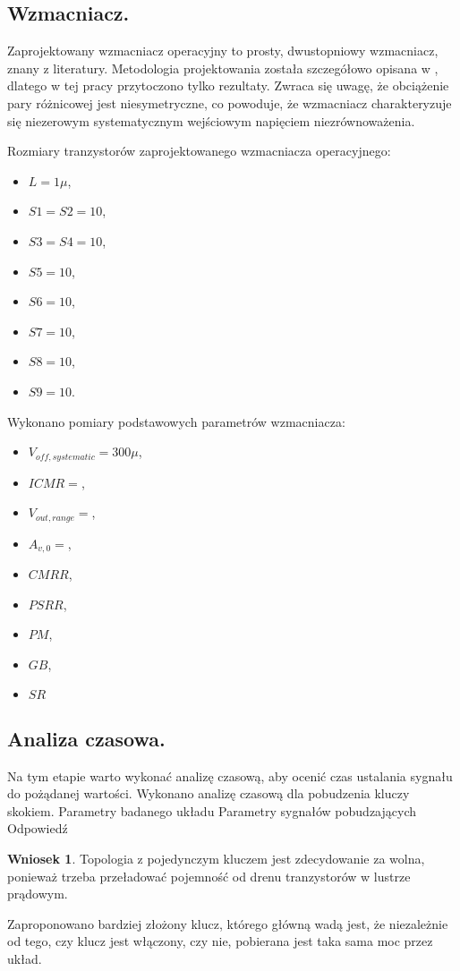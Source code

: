 \documentclass[10pt,a4paper]{report}
\theoremstyle{definition}
\theoremstyle{definition}
\theoremstyle{definition}
\theoremstyle{definition}
\theoremstyle{definition}
\newtheorem{wniosek}{Wniosek}[section]
\begin{document}
{	\subsection{Wzmacniacz.}
	{	Zaprojektowany wzmacniacz operacyjny to prosty, dwustopniowy wzmacniacz, znany z literatury. Metodologia projektowania została szczegółowo opisana w \cite{cmosanal}, dlatego w tej pracy przytoczono tylko rezultaty. Zwraca się uwagę, że obciążenie pary różnicowej jest niesymetryczne, co powoduje, że wzmacniacz charakteryzuje się niezerowym systematycznym wejściowym napięciem niezrównoważenia. }
	{	Rozmiary tranzystorów zaprojektowanego wzmacniacza operacyjnego:
		\begin{itemize}
			\item $L = 1\mu$,
			\item $S1 = S2 = 10$, 
			\item $S3 = S4 = 10$,
			\item $S5 = 10$,
			\item $S6 = 10$,
			\item $S7 = 10$,
			\item $S8 = 10$,
			\item $S9 = 10$.
		\end{itemize}
		Wykonano pomiary podstawowych parametrów wzmacniacza:
		\begin{itemize}
			\item $ V_{off,systematic} = 300 \mu$,
			\item $ ICMR = $,
			\item $ V_{out,range} = $,
			\item $ A_{v,0} =  $,
			\item $ CMRR $,
			\item $ PSRR $,
			\item $ PM $,
			\item $ GB $,
			\item $ SR $


		\end{itemize}
	}






	\subsection{Analiza czasowa.}
	{ Na tym etapie warto wykonać analizę czasową, aby ocenić czas ustalania sygnału do pożądanej wartości. Wykonano analizę czasową dla pobudzenia kluczy skokiem.}
	{ Parametry badanego układu }
	{ Parametry sygnałów pobudzających}
	{ Odpowiedź}
	\begin{wniosek}
		Topologia z pojedynczym kluczem jest zdecydowanie za wolna, ponieważ trzeba przeładować pojemność od drenu tranzystorów w lustrze prądowym.
	\end{wniosek}
	{ Zaproponowano bardziej złożony klucz, którego główną wadą jest, że niezależnie od tego, czy klucz jest włączony, czy nie, pobierana jest taka sama moc przez układ.}
	
}
\end{document}
